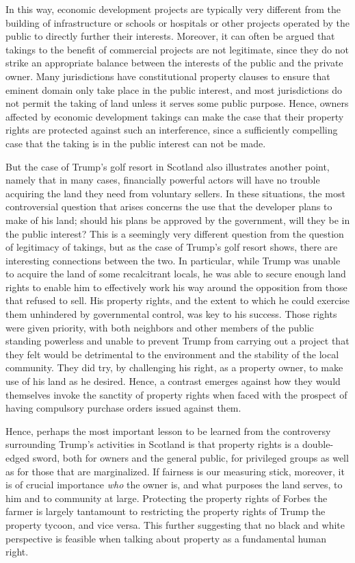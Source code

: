 In this way, economic development projects are typically very different from the building of infrastructure or schools or hospitals or other projects operated by the public to directly further their interests. Moreover, it can often be argued that takings to the benefit of commercial projects are not legitimate, since they do not strike an appropriate balance between the interests of the public and the private owner. Many jurisdictions have constitutional property clauses to ensure that eminent domain only take place in the public interest, and most jurisdictions do not permit the taking of land unless it serves some public purpose. Hence, owners affected by economic development takings can make the case that their property rights are protected against such an interference, since a sufficiently compelling case that the taking is in the public interest can not be made.

But the case of Trump's golf resort in Scotland also illustrates another point, namely that in many cases, financially powerful actors will have no trouble acquiring the land they need from voluntary sellers. In these situations, the most controversial question that arises concerns the use that the developer plans to make of his land; should his plans be approved by the government, will they be in the public interest? This is a seemingly very different question from the question of legitimacy of takings, but as the case of Trump's golf resort shows, there are interesting connections between the two. In particular, while Trump was unable to acquire the land of some recalcitrant locals, he was able to secure enough land rights to enable him to effectively work his way around the opposition from those that refused to sell. His property rights, and the extent to which he could exercise them unhindered by governmental control, was key to his success. Those rights were given priority, with  both neighbors and other members of the public standing  powerless and  unable to prevent Trump from carrying out a project that they felt would be detrimental to the environment and the stability of the local community. They did try, by challenging his right, as a property owner, to make use of his land as he desired. Hence, a contrast emerges against how they would themselves invoke the sanctity of property rights when faced with the prospect of having compulsory purchase orders issued against them. 

Hence, perhaps the most important lesson to be learned from the controversy surrounding Trump's activities in Scotland is that property rights is a double-edged sword, both for owners and the general public, for privileged groups as well as for those that are  marginalized. If fairness is our measuring stick, moreover, it is of crucial importance {\it who} the owner is, and what purposes the land serves, to him and to community at large. Protecting the property rights of Forbes the farmer is largely tantamount to restricting the property rights of Trump the property tycoon, and vice versa. This further suggesting that no black and white perspective is feasible when talking about property as a fundamental human right. 

